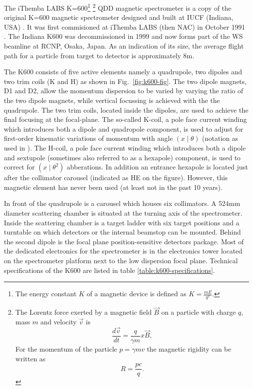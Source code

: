 \documentclass[11pt]{report}
\begin{document}
The iThemba LABS K=600\footnote{The energy constant $K$ of a magnetic device is 
defined as $K=\frac{mE}{q^2}$.} 
\footnote{The Lorentz force exerted by a magnetic field $\overrightarrow{B}$ on a 
particle with charge $q$, mass $m$ and velocity $\overrightarrow{v}$ is
\begin{equation}
   \frac{d\overrightarrow{v}}{dt} = \frac{q}{\gamma m} x \overrightarrow{B},
\end{equation}
For the momentum of the particle $p=\gamma mv$ the magnetic rigidity can be written as
\begin{equation}
R=\frac{pc}{q}.
\end{equation}
}
QDD magnetic spectrometer is a copy of the original K=600 
magnetic spectrometer designed and built at IUCF (Indiana, USA) \cite{K600Nim_to_be_submitted}.
It was first commisioned at iThemba LABS (then NAC) in October 1991 \cite{AnRep91}.
The Indiana K600 was decommissioned in 1999 and now forms part of the WS beamline 
at RCNP, Osaka, Japan.
As an indication of its size, the average flight path for a particle from target to 
detector is approximately 8m.

The K600 consists of five active elements namely a quadrupole, two dipoles and two trim 
coils (K and H) as shown in Fig.~\ref{fig:k600-fig}. The two dipole magnets, D1 and D2, 
allow the momentum dispersion to be varied by varying the ratio of the two dipole magnets, 
while vertical focussing is achieved with the the quadrupole.  
The two trim coils, located inside the dipoles, are used to achieve the final focusing at 
the focal-plane. The so-called K-coil, a pole face current winding which introduces both 
a dipole and quadropole component,  is used to adjust 
for first-order kinematic variations of momentum with angle $\left( x\mid \theta\right)$ 
(notation as used in \cite{Eng81}). 
The H-coil, a pole face current winding which introduces both a dipole and sextupole 
(sometimes also referred to as a hexapole) component, 
is used to correct for $\left( x\mid \theta ^{2}\right)$ abberations. 
In addition an entrance hexapole is located just after the collimator carousel (indicated as HE on the figure). 
However, this magnetic element has never been used (at least not in the past 10 years).

In front of the quadrupole is a carousel which houses six collimators. 
A 524mm diameter scattering chamber is situated at the turning axis of the spectrometer. 
Inside the scattering chamber is a target ladder with six target positions and a 
turntable on which detectors or the internal beamstop can be mounted. 
Behind the second dipole is the focal plane position-sensitive detectors package.
Most of the dedicated electronics for the spectrometer is in the electronics tower located 
on the spectrometer platform next to the low dispersion focal plane.
Technical specifications of the K600 are listed in 
table \ref{table:k600-specifications}.
\end{document}
